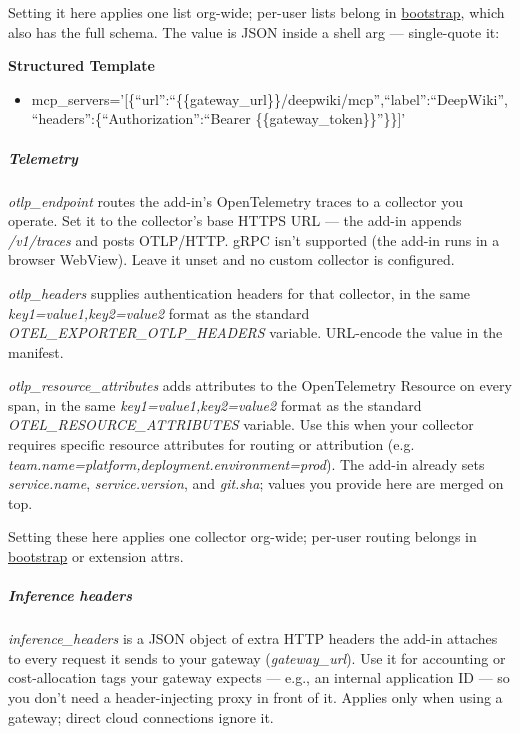 \documentclass[11pt]{article}
\begin{document}
Setting it here applies one list org-wide; per-user lists belong in \href{bootstrap.md\#mcp\_\allowbreak{}servers}{bootstrap}, which also has the full schema. The value is JSON inside a shell arg — single-quote it:


\textbf{Structured Template}
\begin{itemize}[leftmargin=*,itemsep=2pt,topsep=2pt]
\item {} mcp\_\allowbreak{}servers='[\{``url'':``\{\{gateway\_\allowbreak{}url\}\}/deepwiki/mcp'',``label'':``DeepWiki'',``headers'':\{``Authorization'':``Bearer \{\{gateway\_\allowbreak{}token\}\}''\}\}]'
\end{itemize}

\subparagraph{Telemetry}\mbox{}\par

\emph{otlp\_\allowbreak{}endpoint} routes the add-in's OpenTelemetry traces to a collector you operate. Set it to the collector's base HTTPS URL — the add-in appends \emph{/v1/traces} and posts OTLP/HTTP. gRPC isn't supported (the add-in runs in a browser WebView). Leave it unset and no custom collector is configured.


\emph{otlp\_\allowbreak{}headers} supplies authentication headers for that collector, in the same \emph{key1=value1,key2=value2} format as the standard \emph{OTEL\_\allowbreak{}EXPORTER\_\allowbreak{}OTLP\_\allowbreak{}HEADERS} variable. URL-encode the value in the manifest.


\emph{otlp\_\allowbreak{}resource\_\allowbreak{}attributes} adds attributes to the OpenTelemetry Resource on every span, in the same \emph{key1=value1,key2=value2} format as the standard \emph{OTEL\_\allowbreak{}RESOURCE\_\allowbreak{}ATTRIBUTES} variable. Use this when your collector requires specific resource attributes for routing or attribution (e.g. \emph{team.name=platform,deployment.environment=prod}). The add-in already sets \emph{service.name}, \emph{service.version}, and \emph{git.sha}; values you provide here are merged on top.


Setting these here applies one collector org-wide; per-user routing belongs in \href{bootstrap.md\#telemetry}{bootstrap} or extension attrs.


\subparagraph{Inference headers}\mbox{}\par

\emph{inference\_\allowbreak{}headers} is a JSON object of extra HTTP headers the add-in attaches to every request it sends to your gateway (\emph{gateway\_\allowbreak{}url}). Use it for accounting or cost-allocation tags your gateway expects — e.g., an internal application ID — so you don't need a header-injecting proxy in front of it. Applies only when using a gateway; direct cloud connections ignore it.
\end{document}
